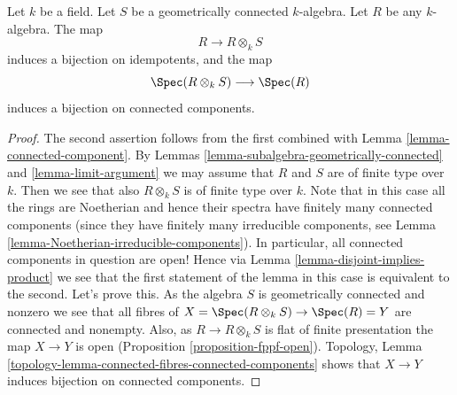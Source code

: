 \begin{lemma}
\label{lemma-geometrically-connected-any-base-change}
Let $k$ be a field.
Let $S$ be a geometrically connected $k$-algebra.
Let $R$ be any $k$-algebra.
The map
$$
R \longrightarrow R \otimes_k S
$$
induces a bijection on idempotents, and the map
$$
\Spec(R \otimes_k S) \longrightarrow \Spec(R)
$$
induces a bijection on connected components.
\end{lemma}

\begin{proof}
The second assertion follows from the first combined with
Lemma \ref{lemma-connected-component}.
By Lemmas \ref{lemma-subalgebra-geometrically-connected}
and \ref{lemma-limit-argument} we may assume that $R$ and $S$
are of finite type over $k$. Then we see that also
$R \otimes_k S$ is of finite type over $k$. Note that in this
case all the rings are Noetherian and hence their spectra
have finitely many connected components (since they have
finitely many irreducible components, see
Lemma \ref{lemma-Noetherian-irreducible-components}).
In particular, all connected components in question are open!
Hence via Lemma \ref{lemma-disjoint-implies-product}
we see that the first statement of the
lemma in this case is equivalent to the second. Let's prove this.
As the algebra $S$ is geometrically connected
and nonzero we see that all fibres of $X = \Spec(R \otimes_k S)
\to \Spec(R) = Y$ are connected and nonempty. Also, as
$R \to R \otimes_k S$ is flat of finite presentation the map
$X \to Y$ is open
(Proposition \ref{proposition-fppf-open}).
Topology, Lemma \ref{topology-lemma-connected-fibres-connected-components}
shows that $X \to Y$ induces bijection on connected components.
\end{proof}